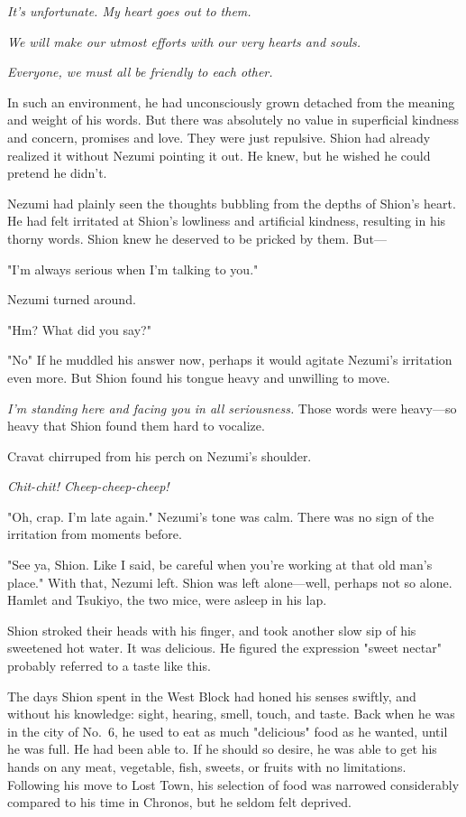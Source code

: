 \emph{It's unfortunate. My heart goes out to them.}

\emph{We will make our utmost efforts with our very hearts and souls.}

\emph{Everyone, we must all be friendly to each other.}

In such an environment, he had unconsciously grown detached from the
meaning and weight of his words. But there was absolutely no value in
superficial kindness and concern, promises and love. They were just
repulsive. Shion had already realized it without Nezumi pointing it out.
He knew, but he wished he could pretend he didn't.

Nezumi had plainly seen the thoughts bubbling from the depths of Shion's
heart. He had felt irritated at Shion's lowliness and artificial
kindness, resulting in his thorny words. Shion knew he deserved to be
pricked by them. But---

"I'm always serious when I'm talking to you."

Nezumi turned around.

"Hm? What did you say?"

"No\el " If he muddled his answer now, perhaps it would agitate
Nezumi's irritation even more. But Shion found his tongue heavy and
unwilling to move.

\emph{I'm standing here and facing you in all seriousness.} Those words were
heavy---so heavy that Shion found them hard to vocalize.

Cravat chirruped from his perch on Nezumi's shoulder.

\emph{Chit-chit! Cheep-cheep-cheep!}

"Oh, crap. I'm late again." Nezumi's tone was calm. There was no sign of
the irritation from moments before.

"See ya, Shion. Like I said, be careful when you're working at that old
man's place." With that, Nezumi left. Shion was left alone---well, perhaps
not so alone. Hamlet and Tsukiyo, the two mice, were asleep in his lap.

Shion stroked their heads with his finger, and took another slow sip of
his sweetened hot water. It was delicious. He figured the expression
"sweet nectar" probably referred to a taste like this.

The days Shion spent in the West Block had honed his senses swiftly, and
without his knowledge: sight, hearing, smell, touch, and taste. Back
when he was in the city of No.~6, he used to eat as much "delicious"
food as he wanted, until he was full. He had been able to. If he should
so desire, he was able to get his hands on any meat, vegetable, fish,
sweets, or fruits with no limitations. Following his move to Lost Town,
his selection of food was narrowed considerably compared to his time in
Chronos, but he seldom felt deprived.

